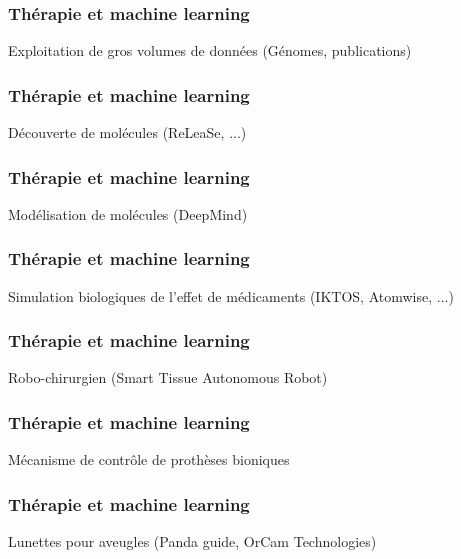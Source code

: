 \begin{frame}
  \frametitle{Thérapie et machine learning}
  Exploitation de gros volumes de données (Génomes, publications)
  \newline
  \newline
  \begin{minipage}[c]{0.49\linewidth}
  \end{minipage}\hfill
  \begin{minipage}[c]{0.49\linewidth}
  \end{minipage}\hfill
\end{frame}


\begin{frame}
  \frametitle{Thérapie et machine learning}
  Découverte de molécules (ReLeaSe, ...) 
\end{frame}

\begin{frame}
  \frametitle{Thérapie et machine learning}
  Modélisation de molécules (DeepMind)
\end{frame}

\begin{frame}
  \frametitle{Thérapie et machine learning}
  \begin{minipage}[c]{0.49\linewidth}
    Simulation biologiques de l'effet de médicaments (IKTOS, Atomwise, ...)
  \end{minipage}\hfill
  \begin{minipage}[c]{0.49\linewidth}
  \end{minipage}\hfill
\end{frame}

\begin{frame}
  \frametitle{Thérapie et machine learning}
  Robo-chirurgien (Smart Tissue Autonomous Robot)
\end{frame}

\begin{frame}
  \frametitle{Thérapie et machine learning}
  Mécanisme de contrôle de prothèses bioniques
\end{frame}

\begin{frame}
  \frametitle{Thérapie et machine learning}
  Lunettes pour aveugles (Panda guide, OrCam Technologies)
\end{frame}

